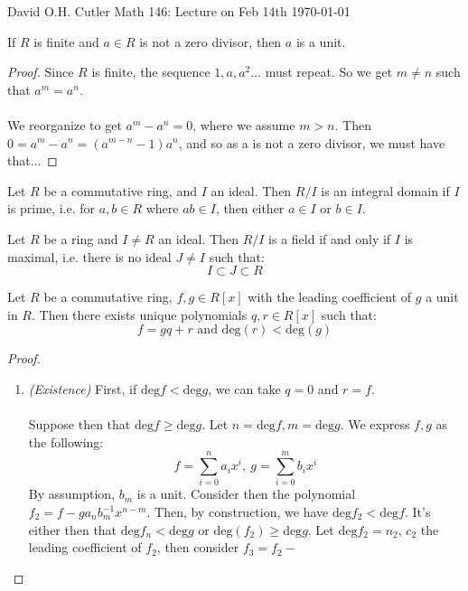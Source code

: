 \documentclass[12pt]{article}
\newenvironment{theorem}[2][Theorem]{\begin{trivlist}
    \item[\hskip \labelsep {\bfseries #1}\hskip \labelsep {\bfseries #2.}]}{\end{trivlist}}
\newenvironment{lemma}[2][Lemma]{\begin{trivlist}
    \item[\hskip \labelsep {\bfseries #1}\hskip \labelsep {\bfseries #2.}]}{\end{trivlist}}
\begin{document}
\noindent David O.H. Cutler \hfill {\Large Math 146: Lecture on Feb 14th} \hfill \today

\begin{lemma}{1}
    If $R$ is finite and $a \in R$ is not a zero divisor, then $a$ is a unit.
    \begin{proof}
        Since $R$ is finite, the sequence $1, a, a^2 ...$ must repeat. So we get $m \neq n$ such that $a^m = a^n$. \\ \\
        We reorganize to get $a^m - a^n = 0$, where we assume $m > n$. Then $0 = a^m - a^n = (a^{m - n} - 1)a^n$, and so as a is not a zero divisor, we must have that...
    \end{proof}
\end{lemma}

\begin{lemma}{(Quotient Integral Domain)}
    Let $R$ be a commutative ring, and $I$ an ideal. Then $R/I$ is an integral domain if $I$ is prime, i.e. for $a, b \in R$ where $ab \in I$, then either $a \in I$ or $b \in I$.
\end{lemma}

\begin{lemma}{(Quotient Field)}
    Let $R$ be a ring and $I \neq R$ an ideal. Then $R/I$ is a field if and only if $I$ is maximal, i.e. there is no ideal $J \neq I$ such that:
    $$I \subset J \subset R$$
\end{lemma}

\begin{theorem}{(Polynomial Division Algorithm)}
    Let $R$ be a commutative ring, $f, g \in R[x]$ with the leading coefficient of $g$ a unit in $R$. Then there exists unique polynomials $q, r \in R[x]$ such that:
    $$f = gq + r \text{ and } \text{deg}(r) < \text{deg}(g)$$
    \begin{proof}
        \begin{enumerate}[label=(\roman*)]
            \item \textit{(Existence)} First, if $\text{deg} f < \text{deg} g$, we can take $q = 0$ and $r = f$. \\ \\
            Suppose then that $\text{deg} f \geq \text{deg} g$. Let $n = \text{deg} f, m = \text{deg}g$. We express $f,g$ as the following:
            $$f = \sum_{i = 0}^n a_ix^i, \: g = \sum_{i = 0}^m b_ix^i$$
            By assumption, $b_m$ is a unit. Consider then the polynomial $f_2 = f - ga_nb_m^{-1}x^{n-m}$. Then, by construction, we have $\text{deg} f_2 < \text{deg} f$. It's either then that $\text{deg}f_n < \text{deg}g$ or $\text{deg}(f_2) \geq \text{deg}g$. Let $\text{deg} f_2 = n_2$, $c_2$ the leading coefficient of $f_2$,  then consider $f_3 = f_2 -$
        \end{enumerate}
    \end{proof}
\end{theorem}
\end{document}
